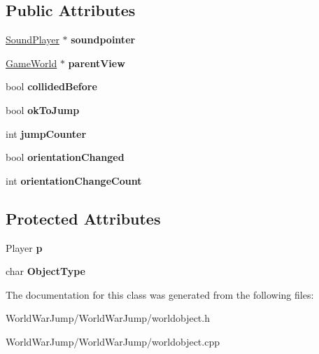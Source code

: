\subsection*{Public Attributes}
\begin{DoxyCompactItemize}
\item 
\hyperlink{class_sound_player}{Sound\+Player} $\ast$ {\bfseries soundpointer}\hypertarget{class_world_object_aa42e809573507ad4b6a72b67521f004e}{}\label{class_world_object_aa42e809573507ad4b6a72b67521f004e}

\item 
\hyperlink{class_game_world}{Game\+World} $\ast$ {\bfseries parent\+View}\hypertarget{class_world_object_a0d420f146459b4776aab6c177847a717}{}\label{class_world_object_a0d420f146459b4776aab6c177847a717}

\item 
bool {\bfseries collided\+Before}\hypertarget{class_world_object_aa9eb87ca75a3c0147a20e214898306e2}{}\label{class_world_object_aa9eb87ca75a3c0147a20e214898306e2}

\item 
bool {\bfseries ok\+To\+Jump}\hypertarget{class_world_object_ae8ec648eb0fff181a1f99474863d2768}{}\label{class_world_object_ae8ec648eb0fff181a1f99474863d2768}

\item 
int {\bfseries jump\+Counter}\hypertarget{class_world_object_aaab8ba5520b5ea3d04b38cf86089f1c7}{}\label{class_world_object_aaab8ba5520b5ea3d04b38cf86089f1c7}

\item 
bool {\bfseries orientation\+Changed}\hypertarget{class_world_object_a79be554114fe33bdcf4ddaa2e9a970c5}{}\label{class_world_object_a79be554114fe33bdcf4ddaa2e9a970c5}

\item 
int {\bfseries orientation\+Change\+Count}\hypertarget{class_world_object_ab6317ef729bccfc2b06b10dc7a45a9e0}{}\label{class_world_object_ab6317ef729bccfc2b06b10dc7a45a9e0}

\end{DoxyCompactItemize}
\subsection*{Protected Attributes}
\begin{DoxyCompactItemize}
\item 
Player {\bfseries p}\hypertarget{class_world_object_ad976169e7d76aaee0a913852fe861787}{}\label{class_world_object_ad976169e7d76aaee0a913852fe861787}

\item 
char {\bfseries Object\+Type}\hypertarget{class_world_object_a06b54b3198229f49b5ba5dcccc7710eb}{}\label{class_world_object_a06b54b3198229f49b5ba5dcccc7710eb}

\end{DoxyCompactItemize}


The documentation for this class was generated from the following files\+:\begin{DoxyCompactItemize}
\item 
World\+War\+Jump/\+World\+War\+Jump/worldobject.\+h\item 
World\+War\+Jump/\+World\+War\+Jump/worldobject.\+cpp\end{DoxyCompactItemize}
